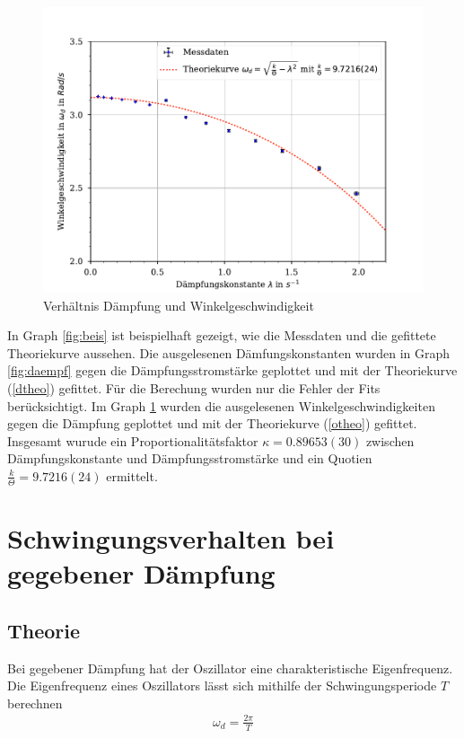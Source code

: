 \documentclass[11pt, a4paper]{article}
\begin{document}
    \begin{figure}
        \centering
        \includegraphics[width=\textwidth]{./7Plot.pdf}

        \caption{Verhältnis Dämpfung und Winkelgeschwindigkeit}
        \label{fig:wink}
    \end{figure}

    In Graph \ref{fig:beis} ist beispielhaft gezeigt, wie die Messdaten und die gefittete Theoriekurve aussehen.
    Die ausgelesenen Dämfungskonstanten wurden in Graph \ref{fig:daempf} gegen die Dämpfungsstromstärke geplottet und mit der
    Theoriekurve (\ref{dtheo}) gefittet. Für die Berechung wurden nur die Fehler der Fits berücksichtigt.
    Im Graph \ref{fig:wink} wurden die ausgelesenen Winkelgeschwindigkeiten gegen die Dämpfung geplottet und mit der Theoriekurve
    (\ref{otheo}) gefittet. Insgesamt wurude ein Proportionalitätsfaktor $\kappa  = 0.89653(30)$ zwischen Dämpfungskonstante und
    Dämpfungsstromstärke und ein Quotien $ \frac{k}{\Theta} = 9.7216(24)$ ermittelt.
   
    \section{Schwingungsverhalten bei gegebener Dämpfung}
    \subsection{Theorie}

    Bei gegebener Dämpfung hat der Oszillator eine charakteristische Eigenfrequenz.
    Die Eigenfrequenz eines Oszillators lässt sich mithilfe der Schwingungsperiode $T$ berechnen
    \begin{align}
        \omega_d = \frac{2\pi}{T}
    \end{align}
\end{document}
